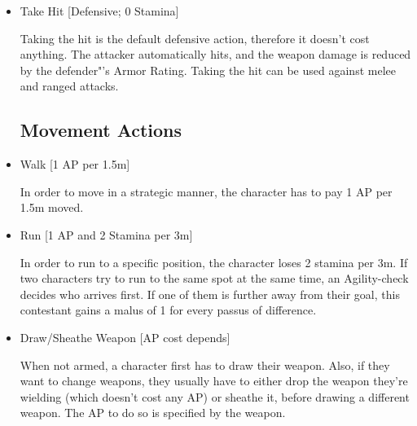 \begin{itemize}
\item Take Hit [Defensive; 0 Stamina]

Taking the hit is the default defensive action, therefore it doesn't cost anything.
The attacker automatically hits, and the weapon damage is reduced by the defender"'s Armor Rating.
Taking the hit can be used against melee and ranged attacks.


\subsection{Movement Actions}\label{subsec:movementCombatActions}

\item Walk [1 AP per 1.5m]

In order to move in a strategic manner, the character has to pay 1 AP per 1.5m moved.


\item Run [1 AP and 2 Stamina per 3m]

In order to run to a specific position, the character loses 2 stamina per 3m.
If two characters try to run to the same spot at the same time, an Agility-check decides who arrives first.
If one of them is further away from their goal, this contestant gains a malus of 1 for every passus of difference.


\item Draw/Sheathe Weapon [AP cost depends]

When not armed, a character first has to draw their weapon.
Also, if they want to change weapons, they usually have to either drop the weapon they're wielding (which doesn't cost any AP) or sheathe it, before drawing a different weapon.
The AP to do so is specified by the weapon.


\end{itemize}